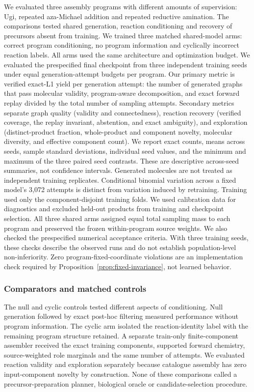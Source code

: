 \documentclass{article}
\theoremstyle{definition}
\newcommand{\ForgeProseAttemptsPerProgram}{3{,}072}
\begin{document}
We evaluated three assembly programs with different amounts of supervision: Ugi, repeated
aza-Michael addition and repeated reductive amination. The comparisons tested shared generation,
reaction conditioning and recovery of precursors absent from training. We trained three matched shared-model arms: correct program conditioning, no program
information and cyclically incorrect reaction labels. All arms used the same architecture and
optimization budget. We evaluated the prespecified final checkpoint from three independent training
seeds under equal generation-attempt budgets per program.
Our primary metric is verified exact-L1 yield per generation attempt: the number of generated graphs that
pass molecular validity, program-aware decomposition, and exact forward replay divided by the total
number of sampling attempts.
Secondary metrics separate graph quality (validity and connectedness), reaction recovery (verified
coverage, the replay invariant, abstention, and exact ambiguity), and exploration (distinct-product fraction, whole-product and
component novelty, molecular diversity, and effective component count).
We report exact counts, means across seeds, sample standard deviations, individual seed values, and
the minimum and maximum of the three paired seed contrasts. These are descriptive across-seed
summaries, not confidence intervals. Generated molecules are not treated as independent training
replicates. Conditional binomial variation across a fixed model's
\ForgeProseAttemptsPerProgram{} attempts is distinct from
variation induced by retraining.
Training used only the component-disjoint training folds. We used calibration data for diagnostics
and excluded held-out products from training and checkpoint selection. All three shared arms
assigned equal total sampling mass to each program and preserved the frozen within-program source
weights.
We also checked the prespecified numerical acceptance criteria. With three training seeds, these
checks describe the observed runs and do not establish population-level non-inferiority. Zero program-fixed-coordinate violations are an implementation check required by
Proposition~\ref{prop:fixed-invariance}, not learned behavior.

\subsubsection{Comparators and matched controls}

The null and cyclic controls tested different aspects of conditioning. Null generation followed
by exact post-hoc filtering measured performance without program information. The cyclic arm
isolated the reaction-identity label with the remaining program structure retained. A separate
train-only finite-component assembler received the exact training components, supported forward
chemistry, source-weighted role marginals and the same number of attempts. We evaluated reaction
validity and exploration separately because catalogue assembly has zero input-component novelty
by construction. None of these comparisons called a precursor-preparation planner, biological oracle or
candidate-selection procedure.
\end{document}

